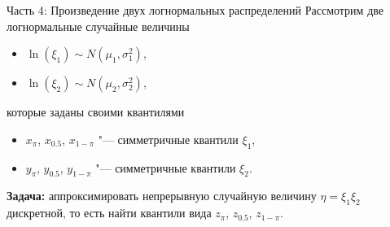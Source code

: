 \documentclass[ucs, notheorems, handout]{beamer}
\begin{document}
	\begin{frame}{Часть 4: Произведение двух логнормальных распределений}
		Рассмотрим две логнормальные случайные величины
		\begin{itemize}
			\item $\ln(\xi_{1}) \sim N(\mu_{1}, \sigma _{1}^{2})$,
			\item $\ln(\xi_{2}) \sim N(\mu_{2}, \sigma _{2}^{2})$,
		\end{itemize}
		которые заданы своими квантилями
		\begin{itemize}
			\item $x_{\pi}$, $x_{0.5}$, $x_{1-\pi}$ "--- симметричные квантили $\xi_{1}$,
			\item $y_{\pi}$, $y_{0.5}$, $y_{1-\pi}$ "--- симметричные квантили $\xi_{2}$.
		\end{itemize}
		
		\bigskip
		
		\textbf{Задача:} аппроксимировать непрерывную случайную величину $\eta = \xi_{1}\xi_{2}$ дискретной, то есть найти квантили вида $z_{\pi}$, $z_{0.5}$, $z_{1-\pi}$.
		
		
	\end{frame}
	
\end{document}
